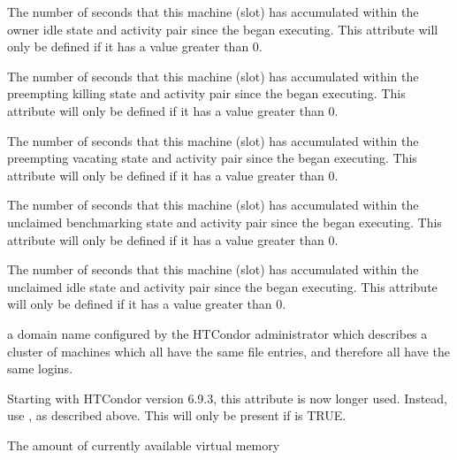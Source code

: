 \begin{description}
%
\item[\AdAttr{TotalTimeOwnerIdle}:] The number of seconds
that this machine (slot) has accumulated within the
owner idle state and activity pair since the 
began executing.
This attribute will only be defined if it has a value greater than 0.
%
\item[\AdAttr{TotalTimePreemptingKilling}:] The number of seconds
that this machine (slot) has accumulated within the
preempting killing state and activity pair since the 
began executing.
This attribute will only be defined if it has a value greater than 0.
%
\item[\AdAttr{TotalTimePreemptingVacating}:] The number of seconds
that this machine (slot) has accumulated within the
preempting vacating state and activity pair since the 
began executing.
This attribute will only be defined if it has a value greater than 0.
%
\item[\AdAttr{TotalTimeUnclaimedBenchmarking}:] The number of seconds
that this machine (slot) has accumulated within the
unclaimed benchmarking state and activity pair since the 
began executing.
This attribute will only be defined if it has a value greater than 0.
%
\item[\AdAttr{TotalTimeUnclaimedIdle}:] The number of seconds
that this machine (slot) has accumulated within the
unclaimed idle state and activity pair since the 
began executing.
This attribute will only be defined if it has a value greater than 0.
%
\item[\AdAttr{UidDomain}:] a domain name configured by the HTCondor 
administrator which describes a cluster of machines which all have 
the same  file entries, and therefore all have the same logins.
%
\item[\AdAttr{VirtualMachineID}:] 
Starting with HTCondor version 6.9.3, this attribute is now longer used.
Instead, use , as described above.
This will only be present if  is TRUE.
%
\item[\AdAttr{VirtualMemory}:] The amount of currently available virtual memory 

\end{description}

